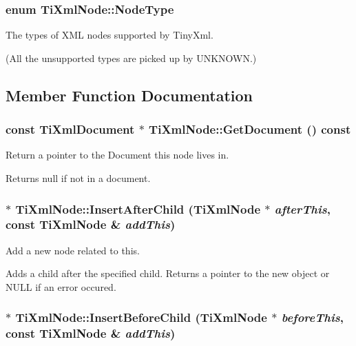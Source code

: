 \subsubsection{\setlength{\rightskip}{0pt plus 5cm}enum {\bf Ti\-Xml\-Node::Node\-Type}\hspace{0.3cm}{\tt  [inherited]}}\label{classTiXmlNode_TiXmlUnknownw7}


The types of XML nodes supported by Tiny\-Xml. 

(All the unsupported types are picked up by UNKNOWN.)

\subsection{Member Function Documentation}
\subsubsection{\setlength{\rightskip}{0pt plus 5cm}const {\bf Ti\-Xml\-Document} $\ast$ Ti\-Xml\-Node::Get\-Document () const\hspace{0.3cm}{\tt  [inherited]}}\label{classTiXmlNode_TiXmlUnknowna63}


Return a pointer to the Document this node lives in. 

Returns null if not in a document.
\subsubsection{ $\ast$ Ti\-Xml\-Node::Insert\-After\-Child ({\bf Ti\-Xml\-Node} $\ast$ {\em after\-This}, const {\bf Ti\-Xml\-Node} \& {\em add\-This})\hspace{0.3cm}{\tt  [inherited]}}\label{classTiXmlNode_TiXmlUnknowna35}


Add a new node related to this. 

Adds a child after the specified child. Returns a pointer to the new object or NULL if an error occured.
\subsubsection{ $\ast$ Ti\-Xml\-Node::Insert\-Before\-Child ({\bf Ti\-Xml\-Node} $\ast$ {\em before\-This}, const {\bf Ti\-Xml\-Node} \& {\em add\-This})\hspace{0.3cm}{\tt  [inherited]}}\label{classTiXmlNode_TiXmlUnknowna34}


